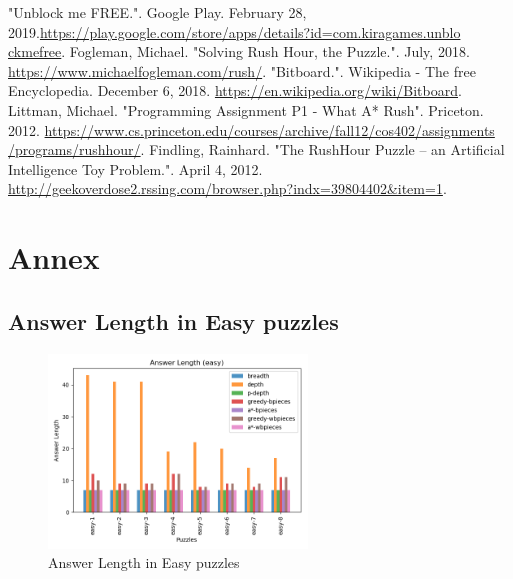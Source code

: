 \documentclass[conference]{IEEEtran}
\begin{document}
\begin{thebibliography}{00}
    
 "Unblock me FREE.". Google Play. February 28, 2019.\href{https://play.google.com/store/apps/details?id=com.kiragames.unblockmefree}{https://play.google.com/store/apps/details?id=com.kiragames.unblo\\ckmefree}.
 Fogleman, Michael. "Solving Rush Hour, the Puzzle.". July, 2018. \href{https://www.michaelfogleman.com/rush/}{https://www.michaelfogleman.com/rush/}.
 "Bitboard.". Wikipedia - The free Encyclopedia. December 6, 2018. \href{https://en.wikipedia.org/wiki/Bitboard}{https://en.wikipedia.org/wiki/Bitboard}.
 Littman, Michael. "Programming Assignment P1 - What A* Rush". Priceton. 2012. \href{https://www.cs.princeton.edu/courses/archive/fall12/cos402/assignments/programs/rushhour/}{https://www.cs.princeton.edu/courses/archive/fall12/cos402/assignments\\/programs/rushhour/}.
 Findling, Rainhard. "The RushHour Puzzle – an Artificial Intelligence Toy Problem.". April 4, 2012. \href{http://geekoverdose2.rssing.com/browser.php?indx=39804402\&item=1}{http://geekoverdose2.rssing.com/browser.php?indx=39804402\&item=1}.
\end{thebibliography}

\newpage

\section{Annex} \label{sec:annex}

\subsection{Answer Length in Easy puzzles}
\begin{figure}[H]
    \centerline{\includegraphics[width=260px]{../../graphics/answerLength-easy.png}}
    \caption{Answer Length in Easy puzzles}
\end{figure}
\end{document}
